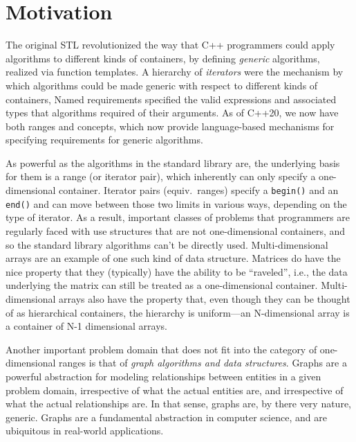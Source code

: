 

\section{Motivation}

The original STL revolutionized the way that C++ programmers could apply algorithms to different kinds of containers, by defining \emph{generic} algorithms, realized via function templates.  
A hierarchy of \emph{iterators} were the mechanism by which algorithms could be made generic with respect to different kinds of containers,
Named requirements specified the valid expressions and associated types that algorithms required of their arguments.  As of C++20, we now have both ranges and concepts, which
now provide language-based mechanisms for specifying requirements for generic algorithms.

As powerful as the algorithms in the standard library are, the underlying basis for them is a range (or iterator pair), which inherently can only specify a one-dimensional container.  
Iterator pairs (equiv.\ ranges) specify a \lstinline{begin()} and an \lstinline{end()} and can move between those two limits in various ways, depending on the type of iterator.
As a result, important classes of problems that programmers are regularly faced with use structures that are not one-dimensional containers, and so the standard library algorithms can't be directly used.
Multi-dimensional arrays are an example of one such kind of data structure. Matrices do have the nice property that they (typically) have the ability to be ``raveled'', i.e., the data underlying the matrix can still be treated as a one-dimensional container.  Multi-dimensional arrays also have the property that, even though they can be thought of as hierarchical containers, the hierarchy is uniform---an N-dimensional array is a container of N-1 dimensional arrays.

Another important problem domain that does not fit into the category of one-dimensional ranges is that of \emph{graph algorithms and data structures}.
Graphs are a powerful abstraction for modeling relationships between entities in a given problem domain,
irrespective of what the actual entities are, and irrespective of what the actual relationships are.
In that sense, graphs are, by there very nature, generic.
Graphs are a fundamental abstraction in computer science, and are ubiquitous in real-world applications.

